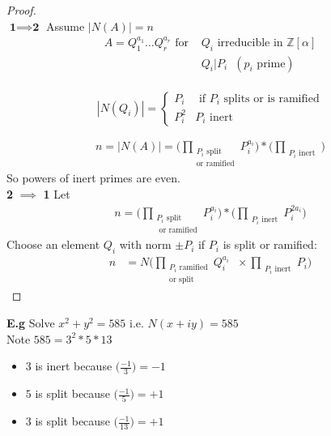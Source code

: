 \documentclass[11pt]{article}
\begin{document}
\begin{proof} $ $\\[1em]
	$\textbf{1} \implies \textbf{2}$ Assume $|N(A)| = n$
	\begin{align*}
		A=Q_1^{a_1}\dots Q_r^{a_r} \text{ for } &Q_i \text{ irreducible in }\mathbb{Z}[\alpha]\\
		&Q_i|P_i \hspace{7pt} (p_i \text{ prime}) \\[0.5em]
	\end{align*}
	
	\begin{equation*}
		|N(Q_i)| = 
		\begin{cases}
			P_i & \text{ if $P_i$ splits or is ramified}\\
			P_i^2 & \text{$P_i$ inert}
		\end{cases}
	\end{equation*}


	\begin{align*}
		n = |N(A)| = \Bigg( \prod_{\substack{\text{$P_i $ split } \\\text{or ramified} }} P_i^{a_i} \Bigg)* \Bigg( \prod_{\substack{\text{$P_i$ inert}}} \Bigg)  
	\end{align*}
	So powers of inert primes are even.$ $\\[1em]

	\textbf{2} $\implies $ \textbf{1} Let
	\begin{align*}
		n = \Bigg( \prod_{\substack{\text{$P_i$ split} \\\text{ or ramified} }} P_i^{a_i}\Bigg) * \Bigg( \prod_{\substack{\text{$P_i$ inert}}} P_i^{2a_i} \Bigg)
	\end{align*}
	Choose an element $Q_i$ with norm $\pm P_i$ if $P_i$ is split or ramified:
	\begin{align*}
		n &= N \Bigg( \prod_{\substack{\text{$P_i$ ramified} \\ \text{or split}}} Q_i^{a_i} \hspace{7pt} \times \prod_{\substack{\text{$P_i$ inert}}} P_i  \Bigg)
	\end{align*}
\end{proof}
$ $\\
\textbf{E.g} Solve $x^2 + y^2 = 585$ i.e. $N(x+iy) = 585$\\

Note $585 =3^2*5*13$ 

\begin{itemize}
	\item{$3$ is inert because $\Big( \frac{-1}{3} \Big) = -1$}
	\item{$5$ is split because $\Big( \frac{-1}{5} \Big) = +1$}
	\item{$3$ is split because $\Big( \frac{-1}{13} \Big) = +1$}
\end{itemize}
\end{document}
